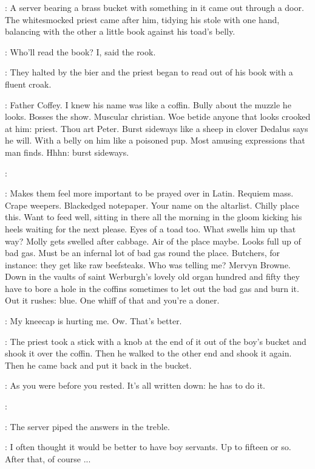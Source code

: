 :
A server bearing a brass bucket with something in it came out through a door.
The whitesmocked priest came after him,
tidying his stole with one hand,
balancing with the other a little book against his toad's belly.

\BloomInt:
Who'll read the book?
I, said the rook.

:
They halted by the bier
and the priest began to read out of his book
with a fluent croak.

\BloomInt:
Father Coffey.
I knew his name was like a coffin.
Bully about the muzzle he looks.
Bosses the show.
Muscular christian.
Woe betide anyone that looks crooked at him:
priest.
Thou art Peter.
Burst sideways like a sheep in clover
Dedalus says he will.
With a belly on him like a poisoned pup.
Most amusing expressions that man finds.
Hhhn:
burst sideways.%

\coffey:

\BloomInt:
Makes them feel more important to be prayed over in Latin.
Requiem mass.
Crape weepers.
Blackedged notepaper.
Your name on the altarlist.
Chilly place this.
Want to feed well, sitting in there all the morning
in the gloom kicking his heels
waiting for the next please.
Eyes of a toad too.
What swells him up that way?
Molly gets swelled after cabbage.
Air of the place maybe.
Looks full up of bad gas.
Must be an infernal lot of bad gas round the place.
Butchers, for instance:
they get like raw beefsteaks.
Who was telling me?
Mervyn Browne.
Down in the vaults of saint Werburgh's
lovely old organ hundred and fifty
they have to bore a hole in the coffins
sometimes to let out the bad gas and burn it.
Out it rushes:
blue.
One whiff of that and you're a doner.

\BloomInt:
My kneecap is hurting me.
Ow.
That's better.

:
The priest took a stick with a knob at the end of it
out of the boy's bucket and shook it over the coffin.
Then he walked to the other end and shook it again.
Then he came back and put it back in the bucket.

\BloomInt:
As you were before you rested.
It's all written down:
he has to do it.

\coffey:

:
The server piped the answers in the treble.

\BloomInt:
I often thought it would be better to have boy servants.
Up to fifteen or so.
After that, of course ...

